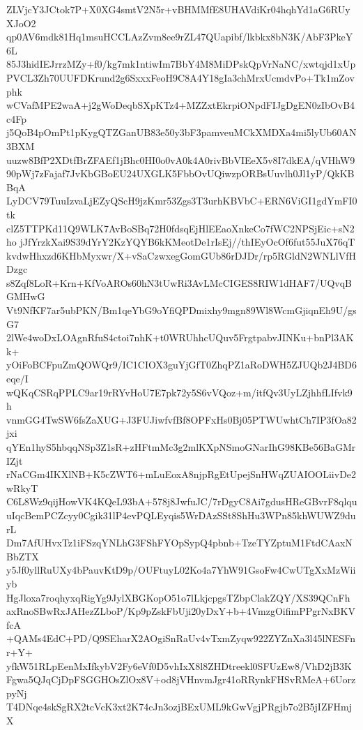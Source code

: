 ZLVjcY3JCtok7P+X0XG4smtV2N5r+vBHMMfE8UHAVdiKr04hqhYd1aG6RUyXJoO2
qp0AV6mdk81Hq1msuHCCLAzZvm8ee9rZL47QUapibf/lkbkx8bN3K/AbF3PkeY6L
85J3hidIEJrrzMZy+f0/kg7mk1ntiwIm7BbY4M8MiDPskQpVrNaNC/xwtqjd1xUp
PVCL3Zh70UUFDKrund2g6SxxxFeoH9C8A4Y18gIa3chMrxUcmdvPo+Tk1mZovphk
wCVafMPE2waA+j2gWoDeqbSXpKTz4+MZZxtEkrpiONpdFIJgDgEN0zIbOvB4c4Fp
j5QoB4pOmPt1pKygQTZGanUB83e50y3bF3pamveuMCkXMDXa4mi5lyUb60AN3BXM
uuzw8BfP2XDtfBrZFAEf1jBhc0HI0o0vA0k4A0rivBbVIEeX5v8I7dkEA/qVHhW9
90pWj7zFajaf7JvKbGBoEU24UXGLK5FbbOvUQiwzpORBsUuvlh0Jl1yP/QkKBBqA
LyDCV79TuuIzvaLjEZyQScH9jzKmr53Zgs3T3urhKBVbC+ERN6ViGI1gdYmFI0tk
clZ5TTPKd11Q9WLK7AvBoSBq72H0fdsqEjHlEEaoXnkeCo7fWC2NPSjEic+sN2ho
jJfYrzkXai9S39dYrY2KzYQYB6kKMeotDe1rIsEj//thIEyOcOf6fut55JuX76qT
kvdwHhxzd6KHbMyxwr/X+vSaCzwxegGomGUb86rDJDr/rp5RGldN2WNLlVfHDzgc
s8Zqf8LoR+Krn+KfVoAROs60hN3tUwRi3AvLMcCIGES8RIW1dHAF7/UQvqBGMHwG
Vt9NfKF7ar5ubPKN/Bm1qeYbG9oYfiQPDmixhy9mgn89Wl8WcmGjiqnEh9U/gsG7
2lWe4woDxLOAgnRfuS4ctoi7nhK+t0WRUhhcUQuv5FrgtpabvJINKu+bnPl3AKk+
yOiFoBCFpuZmQOWQr9/IC1CIOX3guYjGfT0ZhqPZ1aRoDWH5ZJUQb2J4BD6eqe/I
wQKqCSRqPPLC9ar19rRYvHoU7E7pk72y5S6vVQoz+m/itfQv3UyLZjhhfLIfvk9h
vnmGG4TwSW6fsZaXUG+J3FUJiwfvfBf8OPFxHs0Bj05PTWUwhtCh7IP3fOa82jxi
qYEn1hyS5hbqqNSp3Z1sR+zHFtmMc3g2mlKXpNSmoGNarIhG98KBe56BaGMrIZjt
rNaCGm4IKXlNB+K5cZWT6+mLuEoxA8njpRgEtUpejSnHWqZUAIOOLiivDe2wRkyT
C6L8Wz9qijHowVK4KQeL93bA+578j8JwfuJC/7rDgyC8Ai7gdusHReGBvrF8qlqu
uIqcBemPCZcyy0Cgik31lP4evPQLEyqis5WrDAzSSt8ShHu3WPn85khWUWZ9durL
Dm7AfUHvxTz1iFSzqYNLhG3FShFYOpSypQ4pbnb+TzeTYZptuM1FtdCAaxNBbZTX
y5Jf0yllRuUXy4bPauvKtD9p/OUFtuyL02Ko4a7YhW91GsoFw4CwUTgXxMzWiiyb
HgJloxa7roqhyxqRigYg9JylXBGKopO51o7lLkjcpgsTZbpClakZQY/XS39QCnFh
axRnoSBwRxJAHezZLboP/Kp9pZskFbUji20yDxY+b+4VmzgOifimPPgrNxBKVfcA
+QAMs4EdC+PD/Q9SEharX2AOgiSnRaUv4vTxmZyqw922ZYZnXa3l45lNESFnr+Y+
yfkW51RLpEenMxIfkybV2Fy6eVf0D5vhIxX8l8ZHDtreekl0SFUzEw8/VhD2jB3K
Fgwa5QJqCjDpFSGGHOsZlOx8V+od8jVHnvmJgr41oRRynkFHSvRMeA+6UorzpyNj
T4DNqe4skSgRX2tcVcK3xt2K74cJn3ozjBExUML9kGwVgjPRgjb7o2B5jIZFHmjX
